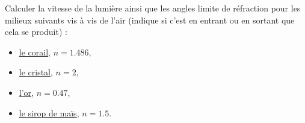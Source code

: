 

\begin{exercice}\label{exo104}
Calculer la vitesse de la lumière ainsi que les angles limite de réfraction pour les milieux suivants vis à vis de l'air (indique si c'est en entrant ou en sortant que cela se produit) : 
\begin{itemize}
\item \href{http://fr.wikipedia.org/wiki/Corail}{le corail}, $n=1.486$,
\item \href{http://fr.wikipedia.org/wiki/Cristal}{le cristal}, $n=2$,
\item \href{http://fr.wikipedia.org/wiki/Or}{l'or}, $n=0.47$,
\item \href{http://fr.wikipedia.org/wiki/Sirop_de_ma%C3%AFs}{le sirop de maïs}, $n=1.5$.
\end{itemize}

\end{exercice}
